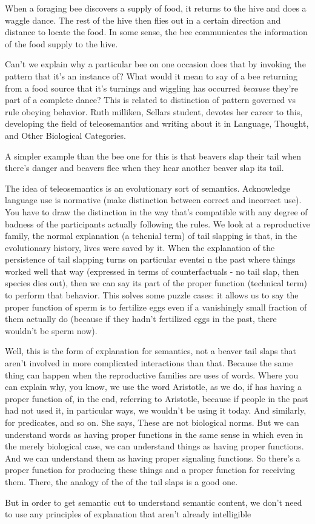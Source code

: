 When a foraging bee discovers a supply of food, it returns to the hive and does
a waggle dance. The rest of the hive then flies out in a certain direction and
distance to locate the food. In some sense, the bee communicates the information
of the food supply to the hive.

Can't we explain why a particular bee on one
occasion does that by invoking the pattern that
it's an instance of? What would it mean to say of
a bee returning from a food source that it's
turnings and wiggling has occurred \emph{because}
they're part of a complete dance? This is related
to distinction of pattern governed vs rule
obeying behavior.\cite{sellars1954some} Ruth milliken, Sellars student,
devotes her career to this, developing the field
of teleosemantics and writing about it in
Language, Thought, and Other Biological
Categories.

A simpler example than the bee one for this is
that beavers slap their tail when there's danger
and beavers flee when they hear another beaver
slap its tail.

The idea of teleosemantics is an evolutionary
sort of semantics. Acknowledge language use is
normative (make distinction between correct and
incorrect use). You have to draw the distinction
in the way that's compatible with any degree of
badness of the participants actually following
the rules. We look at a reproductive family, the
normal explanation (a tehcnial term) of tail
slapping is that, in the evolutionary history,
lives were saved by it. When the explanation of
the persistence of tail slapping turns on
particular eventsi n the past where things worked
well that way (expressed in terms of
counterfactuals - no tail slap, then species dies
out), then we can say its part of the proper
function (technical term) to perform that
behavior. This  solves some puzzle cases: it
allows us to say the proper function of sperm is
to fertilize eggs even if a vanishingly small
fraction of them actually do (because if they
hadn't fertilized eggs in the past, there
wouldn't be sperm now).

Well, this is the form of explanation for semantics, not a beaver tail slaps
that aren't involved in more complicated interactions than that. Because the
same thing can happen when the reproductive families are uses of words. Where
you can explain why, you know, we use the word Aristotle, as we do, if has
having a proper function of, in the end, referring to Aristotle, because if
people in the past had not used it, in particular ways, we wouldn't be using
it today. And similarly, for predicates, and so on. She says, These are not
biological norms. But we can understand words as having proper functions in the
same sense in which even in the merely biological case, we can understand things
as having proper functions. And we can understand them as having proper
signaling functions. So there's a proper function for producing these things
and a proper function for receiving them. There, the analogy of the of the tail
slaps is a good one.

But in order to get semantic cut to understand semantic content, we don't need
to use any principles of explanation that aren't already intelligible

